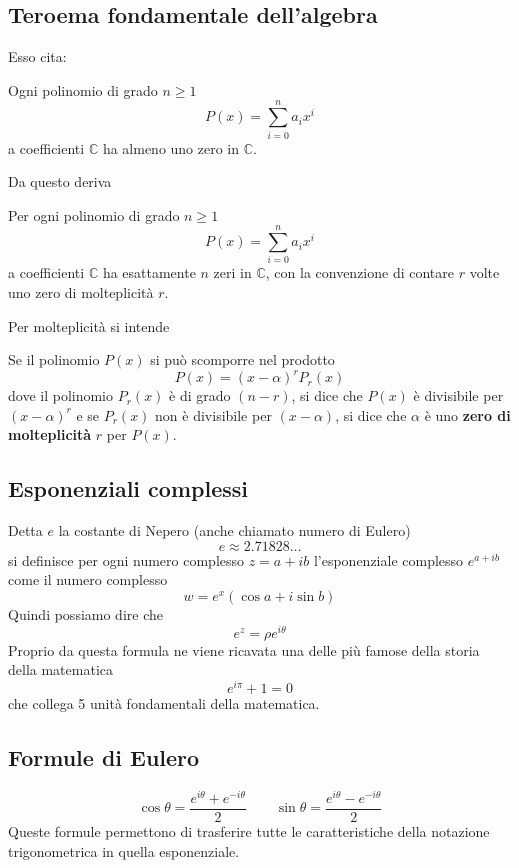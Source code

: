 \subsection{Teroema fondamentale dell'algebra}
Esso cita:
\begin{tfa}
  Ogni polinomio di grado $n\geq1$
  \begin{equation*}
    P(x) = \sum\limits_{i=0}^{n} a_ix^i
  \end{equation*}
  a coefficienti $\mathbb{C}$ ha almeno uno zero in $\mathbb{C}$.
\end{tfa}
Da questo deriva
\begin{tfa-ext}\hypertarget{teor:tfa-ext}{}
  Per ogni polinomio di grado $n\geq1$
  \begin{equation*}
    P(x) = \sum\limits_{i=0}^{n} a_ix^i
  \end{equation*}
  a coefficienti $\mathbb{C}$ ha esattamente $n$ zeri in $\mathbb{C}$, con la convenzione di contare
  $r$ volte uno zero di molteplicità $r$.
\end{tfa-ext}
Per molteplicità si intende
\begin{molteplic}
  Se il polinomio $P(x)$ si può scomporre nel prodotto
  \begin{equation*}
    P(x) = (x-\alpha)^rP_r(x)
  \end{equation*}
  dove il polinomio $P_r(x)$ è di grado $(n-r)$, si dice che $P(x)$ è divisibile per $(x-\alpha)^r$
  e se $P_r(x)$ non è divisibile per $(x-\alpha)$, si dice che $\alpha$ è uno \textbf{zero di 
  molteplicità} $r$ per $P(x)$.
\end{molteplic}

\subsection{Esponenziali complessi}
Detta $e$ la costante di Nepero (anche chiamato numero di Eulero)
\begin{equation*}
  e \approx 2.71828\ldots
\end{equation*}
si definisce per ogni numero complesso $z = a+ib$ l'esponenziale complesso $e^{a+ib}$ come il numero
complesso 
\begin{equation*}
  w=e^x(\cos a+i\sin b)
\end{equation*}
Quindi possiamo dire che 
\begin{equation*}
  e^{z} = \rho e^{i\theta}
\end{equation*}
Proprio da questa formula ne viene ricavata una delle più famose della storia della matematica
\begin{equation*}
  e^{i\pi}+1=0
\end{equation*}
che collega 5 unità fondamentali della matematica.

\subsection{Formule di Eulero}
\begin{equation*}
  \cos\theta=\frac{e^{i\theta}+e^{-i\theta}}{2}\qquad\sin\theta=\frac{e^{i\theta}-e^{-i\theta}}{2}
\end{equation*}
Queste formule permettono di trasferire tutte le caratteristiche della notazione trigonometrica in 
quella esponenziale.
